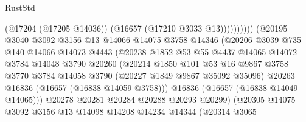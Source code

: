 \begin{lexlean}{RustStd}
\begin{coremodule}
                                            (@17204 (@17205 @14036))
                                            (@16657 (@17210 @3033 @13))))))))))
                            (@20195
                              @3040
                              @3092
                              @3156
                              @13
                              @14066
                              @14075
                              @3758
                              @14346
                              (@20206
                                @3039
                                @735
                                @140
                                @14066
                                @14073
                                @4443
                                (@20238
                                  @1852
                                  @53
                                  @55
                                  @4437
                                  @14065
                                  @14072
                                  @3784
                                  @14048
                                  @3790
                                  @20260
                                  (@20214
                                    @1850
                                    @101
                                    @53
                                    @16
                                    @9867
                                    @3758
                                    @3770
                                    @3784
                                    @14058
                                    @3790
                                    (@20227 @1849 @9867 @35092 @35096)
                                    @20263
                                    @16836
                                    (@16657 (@16838 @14059 @3758)))
                                  @16836
                                  (@16657 (@16838 @14049 @14065)))
                                @20278
                                @20281
                                @20284
                                @20288
                                @20293
                                @20299)
                              (@20305
                                @14075
                                @3092
                                @3156
                                @13
                                @14098
                                @14208
                                @14234
                                @14344
                                (@20314
                                  @3065

\end{coremodule}
\end{lexlean}
